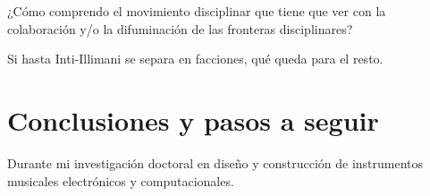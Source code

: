 \documentclass{article}
\begin{document}
¿Cómo comprendo el movimiento disciplinar que tiene que ver con la colaboración y/o la difuminación de las fronteras disciplinares?

Si hasta Inti-Illimani se separa en facciones, qué queda para el resto.

\clearpage

\section{Conclusiones y pasos a seguir}

Durante mi investigación doctoral en diseño y construcción de instrumentos musicales electrónicos y computacionales.

\clearpage

\printbibliography[title={Bibliografía}, heading=bibintoc]
\end{document}
